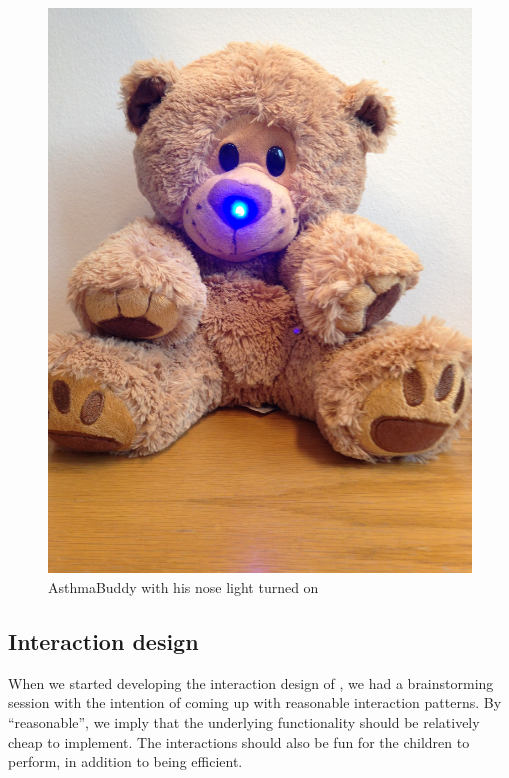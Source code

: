\begin{figure}[H]
\begin{minipage}[t]{0.4\linewidth}
			\includegraphics[width=0.3\paperwidth]{Pictures/abbluelight.jpg}
		\caption{AsthmaBuddy with his nose light turned on}
		\label{fig:asthmabuddyandlightnose}
	\end{minipage}
\end{figure}


\subsection{Interaction design}
\label{sec:interactiondesign}
When we started developing the interaction design of \buddy{}, we had a brainstorming session with the intention of coming up with reasonable interaction patterns.        
By ``reasonable'', we imply that the underlying functionality should be relatively cheap to implement. The interactions should also be fun for the children to perform, in addition to being efficient.  

